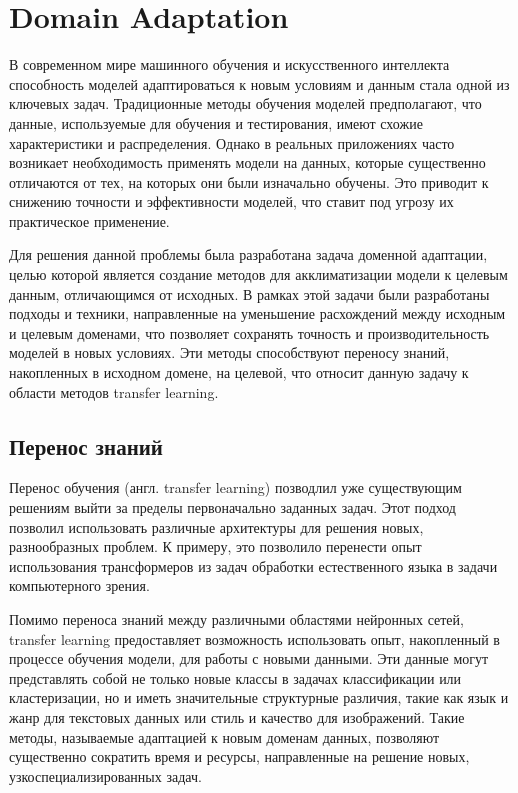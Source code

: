 \section{Domain Adaptation}
\label{sec:Chapter3} 

В современном мире машинного обучения и искусственного интеллекта способность моделей адаптироваться к новым условиям и данным стала одной из ключевых задач. Традиционные методы обучения моделей предполагают, что данные, используемые для обучения и тестирования, имеют схожие характеристики и распределения. Однако в реальных приложениях часто возникает необходимость применять модели на данных, которые существенно отличаются от тех, на которых они были изначально обучены. Это приводит к снижению точности и эффективности моделей, что ставит под угрозу их практическое применение.

Для решения данной проблемы была разработана задача доменной адаптации, целью которой является создание методов для акклиматизации модели к целевым данным, отличающимся от исходных. В рамках этой задачи были разработаны подходы и техники, направленные на уменьшение расхождений между исходным и целевым доменами, что позволяет сохранять точность и производительность моделей в новых условиях. Эти методы способствуют переносу знаний, накопленных в исходном домене, на целевой, что относит данную задачу к области методов transfer learning.

\subsection{Перенос знаний}

Перенос обучения (англ. transfer learning) позводлил уже существующим решениям выйти за пределы первоначально заданных задач. Этот подход позволил использовать различные архитектуры для решения новых, разнообразных проблем. К примеру, это позволило перенести опыт использования трансформеров из задач обработки естественного языка в задачи компьютерного зрения.

Помимо переноса знаний между различными областями нейронных сетей, transfer learning предоставляет возможность использовать опыт, накопленный в процессе обучения модели, для работы с новыми данными. Эти данные могут представлять собой не только новые классы в задачах классификации или кластеризации, но и иметь значительные структурные различия, такие как язык и жанр для текстовых данных или стиль и качество для изображений. Такие методы, называемые адаптацией к новым доменам данных, позволяют существенно сократить время и ресурсы, направленные на решение новых, узкоспециализированных задач.

